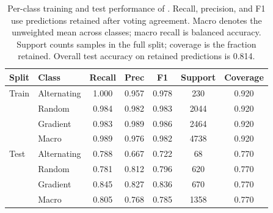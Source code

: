 \begin{table}[h!]
\centering
\caption{Per-class training and test performance of \sysname{}. Recall, precision, and F1 use predictions retained after voting agreement. Macro denotes the unweighted mean across classes; macro recall is balanced accuracy. Support counts samples in the full split; coverage is the fraction retained. Overall test accuracy on retained predictions is 0.814.}
\begin{tabular}{llccccc}
\toprule
\textbf{Split} & \textbf{Class} & \textbf{Recall} & \textbf{Prec} & \textbf{F1} & \textbf{Support} & \textbf{Coverage} \\
\midrule
Train & Alternating & 1.000 & 0.957 & 0.978 & 230 & 0.920 \\
 & Random & 0.984 & 0.982 & 0.983 & 2044 & 0.920 \\
 & Gradient & 0.983 & 0.989 & 0.986 & 2464 & 0.920 \\
 & Macro & 0.989 & 0.976 & 0.982 & 4738 & 0.920 \\
\midrule
Test & Alternating & 0.788 & 0.667 & 0.722 & 68 & 0.770 \\
 & Random & 0.781 & 0.812 & 0.796 & 620 & 0.770 \\
 & Gradient & 0.845 & 0.827 & 0.836 & 670 & 0.770 \\
 & Macro & 0.805 & 0.768 & 0.785 & 1358 & 0.770 \\
\midrule
\bottomrule
\end{tabular}
\label{tab:train_test_voting_performance}
\end{table}
